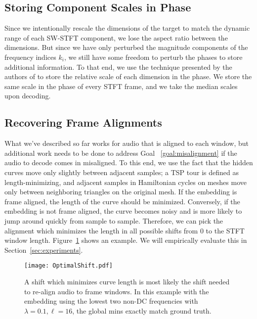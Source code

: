 \documentclass[runningheads]{llncs}
\begin{document}
\subsection{Storing Component Scales in Phase}
\label{sec:componentscales}

Since we intentionally rescale the dimensions of the target to match the dynamic range of each SW-STFT component, we lose the aspect ratio between the dimensions.  But since we have only perturbed the magnitude components of the frequency indices $k_i$, we still have some freedom to perturb the phases to store additional information.  To that end, we use the technique presented by the authors of \cite{xiaoxiao_dong_data_2004} to store the relative scale of each dimension in the phase.  We store the same scale in the phase of every STFT frame, and we take the median scales upon decoding.

\subsection{Recovering Frame Alignments}
\label{sec:framealignments}

What we've described so far works for audio that is aligned to each window, but additional work needs to be done to address Goal ~\ref{goal:misalignment} if the audio to decode comes in misaligned.  To this end, we use the fact that the hidden curves move only slightly between adjacent samples; a TSP tour is defined as length-minimizing, and adjacent samples in Hamiltonian cycles on meshes move only between neighboring triangles on the original mesh.  If the embedding is frame aligned, the length of the curve should be minimized.  Conversely, if the embedding is not frame aligned, the curve becomes noisy and is more likely to jump around quickly from sample to sample.  Therefore, we can pick the alignment which minimizes the length in all possible shifts from $0$ to the STFT window length.  Figure~\ref{fig:FrameAlignments} shows an example.  We will empirically evaluate this in Section~\ref{sec:experiments}.


\begin{figure}
  \centering
  \texttt{[image: OptimalShift.pdf]}
  \caption{A shift which minimizes curve length is most likely the shift needed to re-align audio to frame windows.  In this example with the embedding using the lowest two non-DC frequencies with $\lambda=0.1, \ell=16$, the global mins exactly match ground truth.}
  \label{fig:FrameAlignments}
\end{figure}
\end{document}
